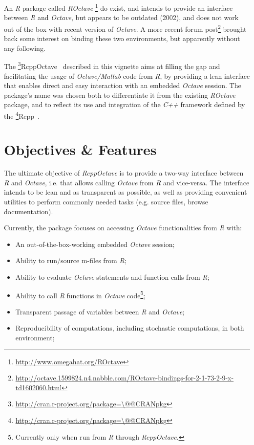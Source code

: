 \documentclass[english,10pt,a4paper]{article}\usepackage{graphicx, color}
\makeatletter
\let\proglang=\textit
\newcommand{\pkgname}[1]{\textit{#1}\xspace}
\newcommand{\Rpkg}[1]{\pkgname{#1} package\xspace}
\newcommand{\CRANurl}[1]{\url{http://cran.r-project.org/package=#1}}
\def\CRANpkg{\@ifstar\@CRANpkg\@@CRANpkg}
\def\@CRANpkg#1{\href{http://cran.r-project.org/package=#1}{\pkgname{#1}}\footnote{\CRANurl{#1}}}
\def\@@CRANpkg#1{\href{http://cran.r-project.org/package=#1}{\pkgname{#1}} package\footnote{\CRANurl{#1}}}
\newcommand{\citeCRANpkg}[1]{\CRANpkg{#1}~\cite{#1}}
\newcommand{\octave}{\proglang{Octave}\xspace}
\makeatother
\begin{document}
An \proglang{R} package called \pkgname{ROctave}
\footnote{\url{http://www.omegahat.org/ROctave}} do exist, and intends to
provide an interface between \proglang{R} and \octave, but appears
to be outdated (2002), and does not work out of the box with recent version of
\octave.
A more recent forum
post\footnote{\url{http://octave.1599824.n4.nabble.com/ROctave-bindings-for-2-1-73-2-9-x-td1602060.html}}
brought back some interest on binding these two environments, but
apparently without any following.

The \citeCRANpkg{RcppOctave} described in this vignette aims at filling the gap
and facilitating the usage of \proglang{Octave/Matlab} code from \proglang{R}, by providing a lean interface that enables direct and easy interaction with an embedded \octave session.
The package's name was chosen both to differentiate it from the
existing \Rpkg{ROctave}, and to reflect its use and integration of the
\proglang{C++} framework defined by the \citeCRANpkg{Rcpp}.

\section{Objectives \& Features}
The ultimate objective of \pkgname{RcppOctave} is to provide a two-way
interface between \proglang{R} and \octave, i.e. that allows calling
\octave from \proglang{R} and vice-versa.
The interface intends to be lean and as transparent as possible, as well
as providing convenient utilities to perform commonly needed tasks (e.g. source
files, browse documentation).

Currently, the package focuses on accessing \octave functionalities
from \proglang{R} with:

\begin{itemize}
 \item An out-of-the-box-working embedded \octave session;
 \item Ability to run/source m-files from \proglang{R};
 \item Ability to evaluate \octave statements and function calls from
 \proglang{R};
 \item Ability to call \proglang{R} functions in \octave
 code\footnote{Currently only when run from \proglang{R} through
 \pkgname{RcppOctave}.};
 \item Transparent passage of variables between \proglang{R} and \octave;
 \item Reproducibility of computations, including stochastic computations, in both environment;
\end{itemize}
\end{document}
